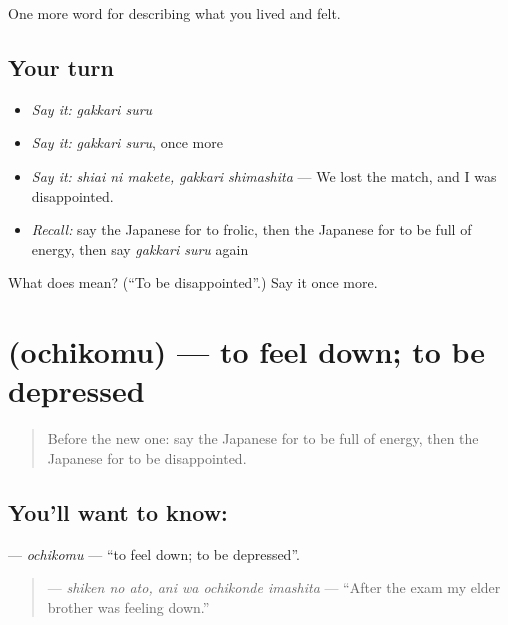 \begin{grammarlens}[title={What you've built}]
One more word for describing what you lived and felt.
\end{grammarlens}

\subsection*{Your turn}
\begin{itemize}
\raggedright
  \item \emph{Say it:} \emph{gakkari suru}
  \item \emph{Say it:} \emph{gakkari suru}, once more
  \item \emph{Say it:} \emph{shiai ni makete, gakkari shimashita} — We lost the match, and I was disappointed.
  \item \emph{Recall:} say the Japanese for to frolic, then the Japanese for to be full of energy, then say \emph{gakkari suru} again
\end{itemize}

\begin{tcolorbox}[breakable,colback=teal!4,colframe=teal!35!black,title={Before you move on}]
What does  mean? (\textquotedblleft{}To be disappointed\textquotedblright{}.) Say it once more.
\end{tcolorbox}
\section[\texorpdfstring{\ja{おちこむ} (ochikomu)}{おちこむ (ochikomu)}]{ (ochikomu) — to feel down; to be depressed}

\label{lesson:JA-C429-ochikomu}



\begin{quote}
Before the new one: say the Japanese for to be full of energy, then the Japanese for to be disappointed.
\end{quote}

\subsection*{You'll want to know: }
\textbf{} — \emph{ochikomu} — \textquotedblleft{}to feel down; to be depressed\textquotedblright{}.

\begin{quote}
\textbf{  } — \emph{shiken no ato, ani wa ochikonde imashita} — \textquotedblleft{}After the exam my elder brother was feeling down.\textquotedblright{}
\end{quote}

